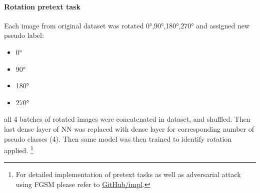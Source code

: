\paragraph{Rotation pretext task}
Each image from original dataset was rotated 0°,90°,180°,270° and assigned new pseudo label:
\begin{itemize}
    \item 0° \textrightarrow {}
    \item 90° \textrightarrow {}
    \item 180° \textrightarrow {}
    \item 270° \textrightarrow {}
\end{itemize}
all 4 batches of rotated images were concatenated in dataset, and shuffled.
Then last dense layer of NN was replaced with dense layer for corresponding number of pseudo classes (4).
Then same model was then trained to identify rotation applied. \footnote{
    For detailed implementation of pretext tasks as well as adversarial attack \\ using FGSM please refer to \href{https://github.com/Goofy-Goof/ISS/blob/33a2ad40b779ff230aae31c29d2edc2cf5d90406/impl}{GitHub/impl}.
}

